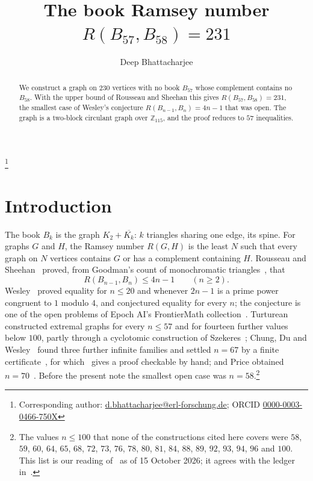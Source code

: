 \documentclass[11pt]{amsart}
\theoremstyle{definition}
\theoremstyle{remark}
\numberwithin{equation}{section}
\newcommand{\Z}{\mathbb{Z}}
\begin{document}
\title[The book Ramsey number $R(B_{57},B_{58})=231$]{The book Ramsey number $R(B_{57},B_{58})=231$}

\author{Deep Bhattacharjee}
\address{Formerly, Electro-Gravitational Space Propulsion Laboratory (EGSPL),\newline Bhubaneswar, Odisha 751030, India}
\thanks{Corresponding author: \href{mailto:d.bhattacharjee@erl-forschung.de}{d.bhattacharjee@erl-forschung.de}; ORCID \href{https://orcid.org/0000-0003-0466-750X}{\mbox{0000-0003-0466-750X}}}


\begin{abstract}
We construct a graph on $230$ vertices with no book $B_{57}$ whose complement contains no $B_{58}$. With the upper bound of Rousseau and Sheehan this gives $R(B_{57},B_{58})=231$, the smallest case of Wesley's conjecture $R(B_{n-1},B_n)=4n-1$ that was open. The graph is a two-block circulant graph over $\Z_{115}$, and the proof reduces to $57$ inequalities.
\end{abstract}

\maketitle

\section{Introduction}

The book $B_k$ is the graph $K_2+\overline{K_k}$: $k$ triangles sharing one edge, its spine. For graphs $G$ and $H$, the Ramsey number $R(G,H)$ is the least $N$ such that every graph on $N$ vertices contains $G$ or has a complement containing $H$. Rousseau and Sheehan~\cite{RS} proved, from Goodman's count of monochromatic triangles~\cite{Go}, that
\begin{equation}\label{eq:RS}
R(B_{n-1},B_n)\le 4n-1\qquad(n\ge2).
\end{equation}
Wesley~\cite{We} proved equality for $n\le20$ and whenever $2n-1$ is a prime power congruent to $1$ modulo $4$, and conjectured equality for every $n$; the conjecture is one of the open problems of Epoch AI's FrontierMath collection~\cite{Ep}. Turturean~\cite{Tu} constructed extremal graphs for every $n\le57$ and for fourteen further values below $100$, partly through a cyclotomic construction of Szekeres~\cite{Sz}; Chung, Du and Wesley~\cite{CDW} found three further infinite families and settled $n=67$ by a finite certificate~\cite{CDWd}, for which~\cite{Bh} gives a proof checkable by hand; and Price obtained $n=70$~\cite{Ep}. Before the present note the smallest open case was $n=58$.\footnote{The values $n\le100$ that none of the constructions cited here covers were $58$, $59$, $60$, $64$, $65$, $68$, $72$, $73$, $76$, $78$, $80$, $81$, $84$, $88$, $89$, $92$, $93$, $94$, $96$ and $100$. This list is our reading of~\cite{CDW,CDWd,Ep,Tu,We} as of 15 October 2026; it agrees with the ledger in~\cite[Section~6.1]{CDWd}.}
\end{document}
